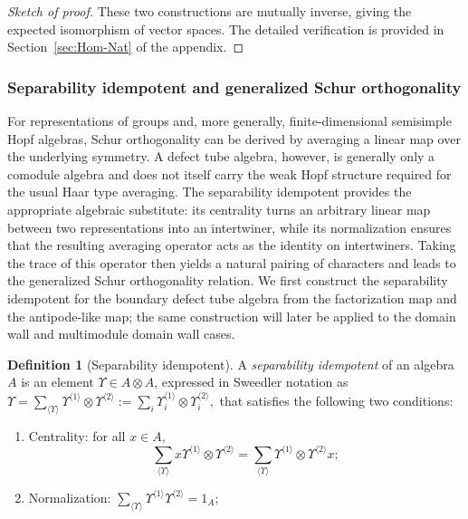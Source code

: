 \documentclass[a4paper,11pt]{article}
\theoremstyle{definition}
\newtheorem{definition}[theorem]{Definition}
\theoremstyle{remark}
\begin{document}
\begin{proof}[Sketch of proof]
These two constructions are mutually inverse, giving the expected isomorphism of vector spaces. 
The detailed verification is provided in Section~\ref{sec:Hom-Nat} of the appendix.
\end{proof}






\subsubsection{Separability idempotent and generalized Schur orthogonality}

For representations of groups and, more generally, finite-dimensional semisimple
Hopf algebras, Schur orthogonality can be derived by averaging a linear map over the underlying symmetry.
A defect tube algebra, however, is generally only a comodule algebra and does not itself carry the weak Hopf structure required for the usual Haar type averaging. 
The separability idempotent provides the appropriate algebraic substitute: its centrality turns an arbitrary linear map between two representations into an intertwiner, while its normalization ensures that the resulting averaging operator acts as the identity on intertwiners. 
Taking the trace of this operator then yields a natural pairing of characters and leads to the generalized Schur orthogonality relation. 
We first construct the separability idempotent for the boundary defect tube algebra from the factorization map and the antipode-like map; the same construction will later be applied to the domain wall and
multimodule domain wall cases.



\begin{definition}[Separability idempotent]
    A \emph{separability idempotent} of an algebra $A$ is an element $\Upsilon \in A \otimes A$, expressed in Sweedler notation as 
    \(
        \Upsilon = \sum_{\langle\Upsilon\rangle} \Upsilon^{\langle 1 \rangle} \otimes \Upsilon^{\langle 2 \rangle} := \sum_{i} \Upsilon_i^{\langle 1 \rangle} \otimes \Upsilon_i^{\langle 2 \rangle},
    \)
    that satisfies the following two conditions:
    \begin{enumerate}
        \item Centrality: for all $x \in A$, 
              \[
                  \sum_{\langle\Upsilon\rangle} x \Upsilon^{\langle 1 \rangle} \otimes \Upsilon^{\langle 2 \rangle} = \sum_{\langle\Upsilon\rangle} \Upsilon^{\langle 1 \rangle} \otimes \Upsilon^{\langle 2 \rangle} x;
              \]
        \item Normalization:
              \(
                  \sum_{\langle\Upsilon\rangle} \Upsilon^{\langle 1 \rangle} \Upsilon^{\langle 2 \rangle} = 1_A;
              \)
    \end{enumerate}
\end{definition}
\end{document}
